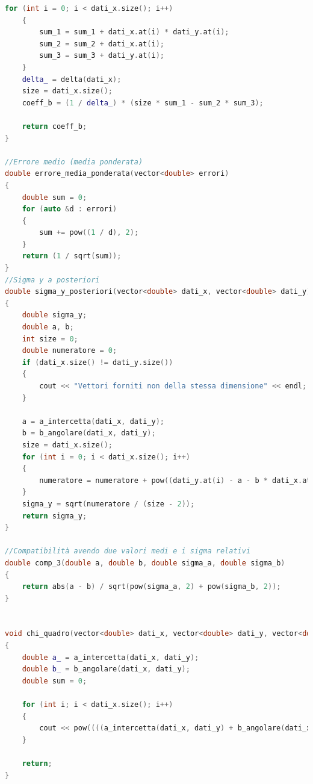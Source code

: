 \documentclass[a4paper,11pt,oneside]{article}
\begin{document}
\begin{lstlisting}[language=C++, label=lst:statistica.h, caption=statistica.h]
    for (int i = 0; i < dati_x.size(); i++)
    {
        sum_1 = sum_1 + dati_x.at(i) * dati_y.at(i);
        sum_2 = sum_2 + dati_x.at(i);
        sum_3 = sum_3 + dati_y.at(i);
    }
    delta_ = delta(dati_x);
    size = dati_x.size();
    coeff_b = (1 / delta_) * (size * sum_1 - sum_2 * sum_3);

    return coeff_b;
}

//Errore medio (media ponderata)
double errore_media_ponderata(vector<double> errori)
{
    double sum = 0;
    for (auto &d : errori)
    {
        sum += pow((1 / d), 2);
    }
    return (1 / sqrt(sum));
}
//Sigma y a posteriori
double sigma_y_posteriori(vector<double> dati_x, vector<double> dati_y)
{
    double sigma_y;
    double a, b;
    int size = 0;
    double numeratore = 0;
    if (dati_x.size() != dati_y.size())
    {
        cout << "Vettori forniti non della stessa dimensione" << endl;
    }

    a = a_intercetta(dati_x, dati_y);
    b = b_angolare(dati_x, dati_y);
    size = dati_x.size();
    for (int i = 0; i < dati_x.size(); i++)
    {
        numeratore = numeratore + pow((dati_y.at(i) - a - b * dati_x.at(i)), 2);
    }
    sigma_y = sqrt(numeratore / (size - 2));
    return sigma_y;
}

//Compatibilità avendo due valori medi e i sigma relativi
double comp_3(double a, double b, double sigma_a, double sigma_b)
{
    return abs(a - b) / sqrt(pow(sigma_a, 2) + pow(sigma_b, 2));
}


void chi_quadro(vector<double> dati_x, vector<double> dati_y, vector<double> err_y)
{
    double a_ = a_intercetta(dati_x, dati_y);
    double b_ = b_angolare(dati_x, dati_y);
    double sum = 0;

    for (int i; i < dati_x.size(); i++)
    {
        cout << pow((((a_intercetta(dati_x, dati_y) + b_angolare(dati_x, dati_y) * dati_x[i]) - dati_y[i])) / err_y[i], 2);
    }
    
    return;
}
\end{lstlisting}
\end{document}
